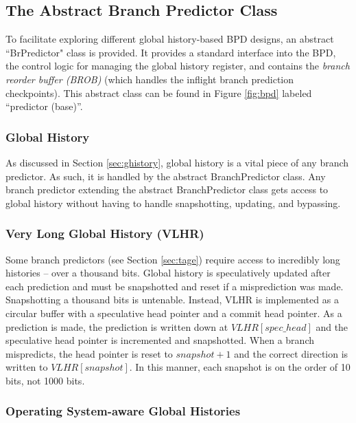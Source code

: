 \subsection{The Abstract Branch Predictor Class}

To facilitate exploring different global history-based BPD designs, an abstract ``BrPredictor" class is provided.  It provides a standard interface into the BPD, the control logic for managing the global history register, and contains the {\em branch reorder buffer (BROB)} (which handles the inflight branch prediction checkpoints). This abstract class can be found in Figure \ref{fig:bpd} labeled ``predictor (base)''.

\subsubsection{Global History}

As discussed in Section \ref{sec:ghistory}, global history is a vital piece of any branch predictor.  As such, it is handled by the abstract BranchPredictor class.  Any branch predictor extending the abstract BranchPredictor class gets access to global history without having to handle  snapshotting, updating, and bypassing.

\subsubsection{Very Long Global History (VLHR)}\label{sec:vlhr}

Some branch predictors (see Section \ref{sec:tage}) require access to incredibly long histories -- over a thousand bits.  Global history is speculatively updated after each prediction and must be snapshotted and reset if a misprediction was made. Snapshotting a thousand bits is untenable.  Instead, VLHR is implemented as a circular buffer with a speculative head pointer and a commit head pointer.  As a prediction is made, the prediction is written down at $VLHR[spec\_head]$ and the speculative head pointer is incremented and snapshotted. When a branch mispredicts, the head pointer is reset to $snapshot+1$ and the correct direction is written to $VLHR[snapshot]$.  In this manner, each snapshot is on the order of 10 bits, not 1000 bits.


\subsubsection{Operating System-aware Global Histories}

